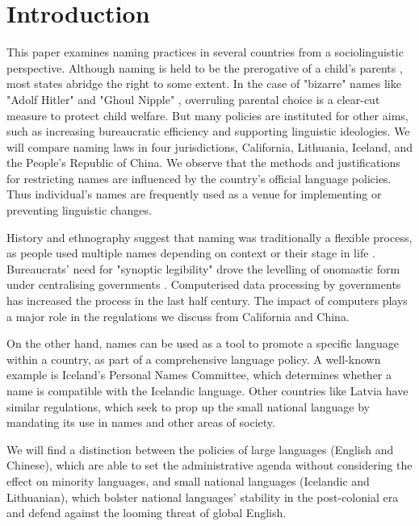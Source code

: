 \section{Introduction}

This paper examines naming practices in several countries from a sociolinguistic perspective. Although naming is held to be the prerogative of a child's parents \parencite{alford87}, most states abridge the right to some extent. In the case of "bizarre" names like "Adolf Hitler" and "Ghoul Nipple" \parencite{larson11}, overruling parental choice is a clear-cut measure to protect child welfare. But many policies are instituted for other aims, such as increasing bureaucratic efficiency and supporting linguistic ideologies. We will compare naming laws in four jurisdictions, California, Lithuania, Iceland, and the People's Republic of China. We observe that the methods and justifications for restricting names are influenced by the country's official language policies. Thus individual's names are frequently used as a venue for implementing or preventing linguistic changes.

History and ethnography suggest that naming was traditionally a flexible process, as people used multiple names depending on context or their stage in life \parencite{alford87} \parencite{scott02}. Bureaucrats' need for "synoptic legibility" drove the levelling of onomastic form under centralising governments \parencite{scott02}. Computerised data processing by governments has increased the process in the last half century. The impact of computers plays a major role in the regulations we discuss from California and China.

On the other hand, names can be used as a tool to promote a specific language within a country, as part of a comprehensive language policy. A well-known example is Iceland's Personal Names Committee, which determines whether a name is compatible with the Icelandic language. Other countries like Latvia have similar regulations, which seek to prop up the small national language by mandating its use in names and other areas of society.

We will find a distinction between the policies of large languages (English and Chinese), which are able to set the administrative agenda without considering the effect on minority languages, and small national languages (Icelandic and Lithuanian), which bolster national languages' stability in the post-colonial era and defend against the looming threat of global English.

